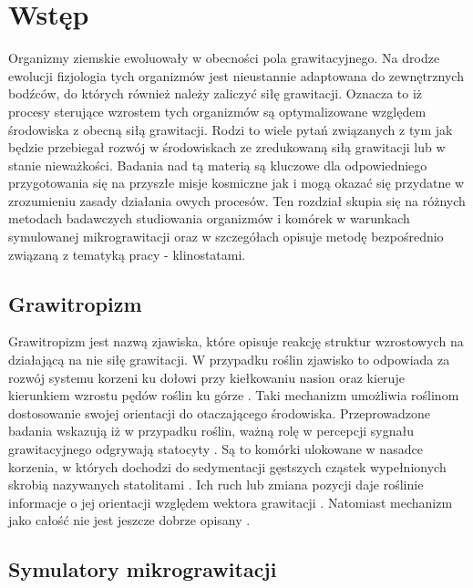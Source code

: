\graphicspath{{./Wstep/images}}

\chapter{Wstęp}

Organizmy ziemskie ewoluowały w obecności pola grawitacyjnego. Na drodze ewolucji
 fizjologia tych organizmów jest nieustannie adaptowana do zewnętrznych bodźców, do których
  również należy zaliczyć siłę grawitacji. Oznacza to iż procesy sterujące wzrostem tych
   organizmów są optymalizowane względem środowiska z obecną siłą grawitacji. Rodzi to
    wiele pytań związanych z tym jak będzie przebiegał rozwój w środowiskach ze zredukowaną
     siłą grawitacji lub w stanie nieważkości. Badania nad tą materią są kluczowe dla
      odpowiedniego przygotowania się na przyszłe misje kosmiczne jak i mogą okazać się
       przydatne w zrozumieniu zasady działania owych procesów. Ten rozdział skupia się
        na różnych metodach badawczych studiowania organizmów i komórek w warunkach
         symulowanej mikrograwitacji oraz w szczegółach opisuje metodę bezpośrednio
          związaną z tematyką pracy - klinostatami. 

\section{Grawitropizm}

Grawitropizm jest nazwą zjawiska, które opisuje reakcję struktur wzrostowych na działającą
 na nie siłę grawitacji. W przypadku roślin zjawisko to odpowiada za rozwój systemu korzeni
  ku dołowi przy kiełkowaniu nasion oraz kieruje kierunkiem wzrostu pędów roślin ku górze
   \cite{bib:grawitropizm}. Taki mechanizm umożliwia roślinom dostosowanie swojej orientacji
   do otaczającego środowiska. Przeprowadzone badania wskazują iż w przypadku roślin, ważną
    rolę w percepcji sygnału grawitacyjnego odgrywają statocyty \cite{bib:statocyty}. Są to
     komórki ulokowane w  nasadce korzenia, w których dochodzi do sedymentacji gęstszych
      cząstek wypełnionych skrobią nazywanych statolitami \cite{bib:statocyty}. Ich ruch lub
       zmiana pozycji daje roślinie informacje o jej orientacji względem wektora grawitacji
        \cite{bib:statocyty}. Natomiast mechanizm jako całość nie jest jeszcze dobrze opisany
         \cite{bib:grawitropizm}.
        
     
\section{Symulatory mikrograwitacji}


